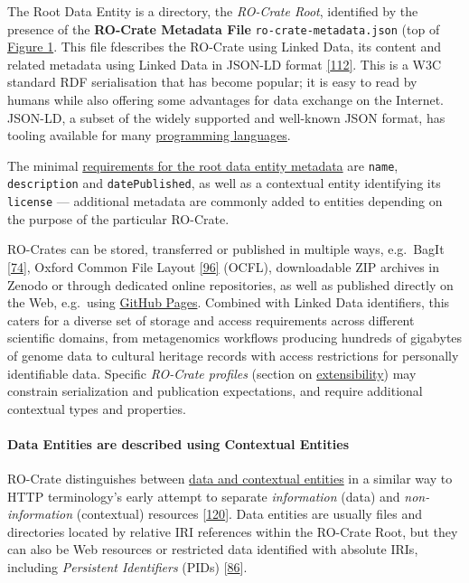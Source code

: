 The Root Data Entity is a directory, the \emph{RO-Crate Root},
identified by the presence of the \textbf{RO-Crate Metadata File}
\texttt{ro-crate-metadata.json} (top of
\protect\hyperlink{fig:conceptual}{Figure 1}. This file fdescribes the
RO-Crate using Linked Data, its content and related metadata using
Linked Data in JSON-LD format
\href{https://www.w3.org/TR/2014/REC-json-ld-20140116/}{{[}112{]}}. This
is a W3C standard RDF serialisation that has become popular; it is easy
to read by humans while also offering some advantages for data exchange
on the Internet. JSON-LD, a subset of the widely supported and
well-known JSON format, has tooling available for many
\href{https://json-ld.org/\#developers}{programming languages}.

The minimal
\href{https://www.researchobject.org/ro-crate/1.1/root-data-entity.html\#direct-properties-of-the-root-data-entity}{requirements
for the root data entity metadata} are \texttt{name},
\texttt{description} and \texttt{datePublished}, as well as a contextual
entity identifying its \texttt{license} --- additional metadata are
commonly added to entities depending on the purpose of the particular
RO-Crate.

RO-Crates can be stored, transferred or published in multiple ways,
e.g.~BagIt {[}\href{https://doi.org/10.17487/rfc8493}{74}{]}, Oxford
Common File Layout \href{https://ocfl.io/1.0/spec/}{{[}96{]}} (OCFL),
downloadable ZIP archives in Zenodo or through dedicated online
repositories, as well as published directly on the Web, e.g.~using
\href{https://pages.github.com/}{GitHub Pages}. Combined with Linked
Data identifiers, this caters for a diverse set of storage and access
requirements across different scientific domains, from metagenomics
workflows producing hundreds of gigabytes of genome data to cultural
heritage records with access restrictions for personally identifiable
data. Specific \emph{RO-Crate profiles} (section on
\protect\hyperlink{profiles}{extensibility}) may constrain serialization
and publication expectations, and require additional contextual types
and properties.

\hypertarget{contextualentities}{%
\paragraph{Data Entities are described using Contextual
Entities}\label{contextualentities}}

RO-Crate distinguishes between
\href{https://www.researchobject.org/ro-crate/1.1/contextual-entities.html\#contextual-vs-data-entities}{data
and contextual entities} in a similar way to HTTP terminology's early
attempt to separate \emph{information} (data) and \emph{non-information}
(contextual) resources
\href{https://www.w3.org/2001/tag/doc/httpRange-14/2007-08-31/HttpRange-14.html}{{[}120{]}}.
Data entities are usually files and directories located by relative IRI
references within the RO-Crate Root, but they can also be Web resources
or restricted data identified with absolute IRIs, including
\emph{Persistent Identifiers} (PIDs)
{[}\href{https://doi.org/10.1371/journal.pbio.2001414}{86}{]}.

